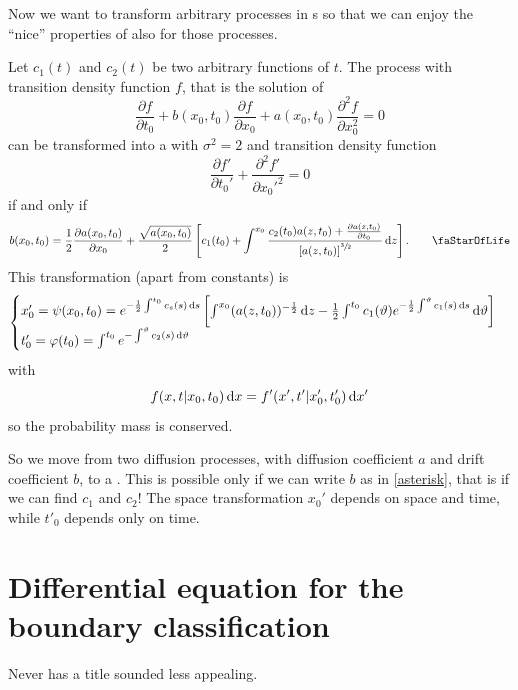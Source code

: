 \documentclass[12pt]{report}
\begin{document}
Now we want to transform arbitrary processes in \bwm s so that we can enjoy the ``nice'' properties of \bwm{} also for those processes.
\begin{theorem}
	Let $c_{1}(t)$ and $c_{2}(t)$ be two arbitrary functions of $t$. The process with transition density function $f$, that is the solution of
	\begin{equation*}
		\frac{\partial f}{\partial t_{0}}+b(x_{0},t_{0})\frac{\partial f}{\partial x_{0}}+a(x_{0},t_{0})\frac{\partial^{2}f}{\partial x^{2}_{0}}=0
	\end{equation*}
	can be transformed into a \bwm{} with $\sigma^{2}=2$ and transition density function
	\begin{equation*}
		\frac{\partial f'}{\partial t_{0}'}+\frac{\partial^{2}f'}{\partial x_{0}'^{2}}=0
	\end{equation*}
	if and only if
	\begin{equation*}
		b(x_{0},t_{0})=\unmezz\frac{\partial a(x_{0},t_{0})}{\partial x_{0}}+\frac{\sqrt{a(x_{0},t_{0})}}{2}\left[c_{1}(t_{0})+\int^{x_{0}}\frac{c_{2}(t_{0})a(z,t_{0})+\frac{\partial a(z,t_{0})}{\partial t_{0}}}{\left[a(z,t_{0})\right]^{\sfrac{3}{2}}}\dz\right].\tag*{\faStarOfLife}\label{asterisk}
	\end{equation*}
	This transformation (apart from constants) is
	\begin{equation*}
		\begin{cases}
			x_{0}'=\psi(x_{0},t_{0})=e^{-\frac{1}{2}\int^{t_{0}}c_{s}(s)\mathop{}\!\mathrm{d} s}\left[\int^{x_{0}}(a(z,t_{0}))^{-\frac{1}{2}}\mathop{}\!\mathrm{d} z-\frac{1}{2}\int^{t_{0}}c_{1}(\vartheta)e^{-\frac{1}{2}\int^{\vartheta}c_{1}(s)\mathop{}\!\mathrm{d} s}\mathop{}\!\mathrm{d}\vartheta\right]\\
			t'_{0}=\varphi(t_{0})=\int^{t_{0}}e^{-\int^{\vartheta}c_{2}(s)\mathop{}\!\mathrm{d}\vartheta}
		\end{cases}
	\end{equation*}
	with 
	\begin{equation*}
		f(x,t|x_{0},t_{0})\mathop{}\!\mathrm{d} x=f'(x',t'|x_{0}',t_{0}')\mathop{}\!\mathrm{d} x'
	\end{equation*}
	so the probability mass is conserved.
\end{theorem}
So we move from two diffusion processes, with diffusion coefficient $a$ and drift coefficient $b$, to a \bwm. This is possible only if we can write $b$ as in \ref{asterisk}, that is if we can find $c_{1}$ and $c_{2}$! The space transformation $x_{0}'$ depends on space and time, while $t'_{0}$ depends only on time.
\section{Differential equation for the boundary classification}
Never has a title sounded less appealing.
\end{document}
